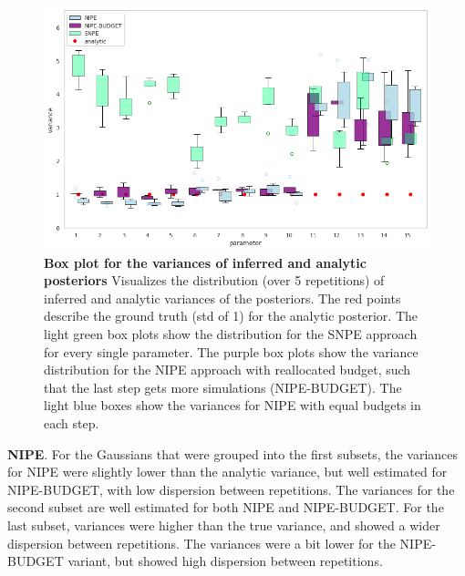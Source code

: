 \documentclass[12pt]{extreport}
\begin{document}
\begin{figure}[h]

 \centering
        \includegraphics[width=0.8\linewidth]{images/toy_example_maf_03_05_ratio_notebook.png}
        
        
        
        
        
\caption{\label{boxplot}\textbf{Box plot for the variances of inferred and analytic posteriors} \small Visualizes the distribution (over 5 repetitions) of inferred and analytic variances of the posteriors. The red points describe the ground truth (std of 1) for the analytic posterior. The light green box plots show the distribution for the SNPE approach for every single parameter. The purple box plots show the variance distribution for the NIPE approach with reallocated budget, such that the last step gets more simulations (NIPE-BUDGET). The light blue boxes show the variances for NIPE with equal budgets in each step. }

\end{figure}

\textbf{NIPE}. For the Gaussians that were grouped into the first subsets, the variances for NIPE were slightly lower than the analytic variance, but well estimated for NIPE-BUDGET, with low dispersion between repetitions. The variances for the second subset are well estimated for both NIPE and NIPE-BUDGET. For the last subset, variances were higher than the true variance, and showed a wider dispersion between repetitions. The variances were a bit lower for the NIPE-BUDGET variant, but showed high dispersion between repetitions. \\
\end{document}
